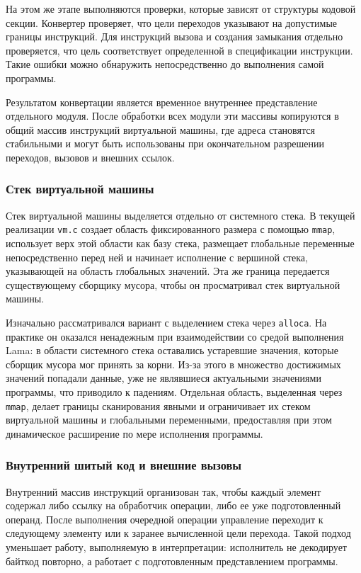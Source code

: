 На этом же этапе выполняются проверки, которые зависят от структуры кодовой секции. Конвертер
проверяет, что цели переходов указывают на допустимые границы инструкций.
Для инструкций вызова и создания замыкания отдельно проверяется, что цель соответствует определенной в спецификации инструкции. Такие ошибки можно обнаружить непосредственно до выполнения самой программы.

Результатом конвертации является временное внутреннее представление отдельного модуля. После
обработки всех модули эти массивы копируются в общий массив инструкций виртуальной машины, где
адреса становятся стабильными и могут быть использованы при окончательном разрешении переходов,
вызовов и внешних ссылок.


\subsubsection{Стек виртуальной машины}

Стек виртуальной машины выделяется отдельно от системного стека. В текущей
реализации \verb=vm.c= создает область фиксированного размера с помощью
\verb=mmap=, использует верх этой области как базу стека, размещает глобальные
переменные непосредственно перед ней и начинает исполнение с вершиной стека,
указывающей на область глобальных значений. Эта же граница передается
существующему сборщику мусора, чтобы он просматривал стек виртуальной машины.

Изначально рассматривался вариант с выделением стека через
\verb=alloca=. На практике он оказался ненадежным при взаимодействии со средой
выполнения Lama: в области системного стека оставались устаревшие значения,
которые сборщик мусора мог принять за корни. Из-за этого в множество
достижимых значений попадали данные, уже не являвшиеся актуальными значениями
программы, что приводило к падениям. Отдельная область, выделенная через
\verb=mmap=, делает границы сканирования явными и ограничивает их стеком
виртуальной машины и глобальными переменными, предоставляя при этом динамическое расширение по мере
исполнения программы.

\subsubsection{Внутренний шитый код и внешние вызовы}

Внутренний массив инструкций организован так, чтобы каждый элемент содержал
либо ссылку на обработчик операции, либо ее уже подготовленный операнд. После
выполнения очередной операции управление переходит к следующему элементу или к
заранее вычисленной цели перехода. Такой подход уменьшает работу, выполняемую
в интерпретации: исполнитель не декодирует байткод повторно, а
работает с подготовленным представлением программы.


